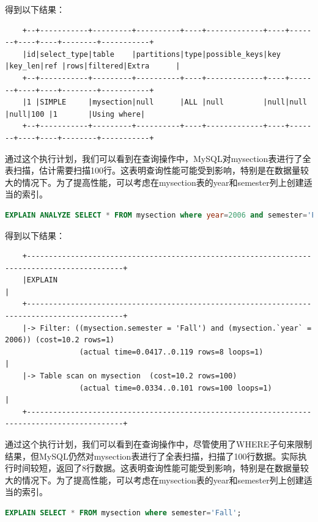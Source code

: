 \documentclass{article}
\begin{document}
	得到以下结果：
	
	\begin{verbatim}
	+--+-----------+---------+----------+----+-------------+----+-------+----+----+--------+-----------+
	|id|select_type|table    |partitions|type|possible_keys|key |key_len|ref |rows|filtered|Extra      |
	+--+-----------+---------+----------+----+-------------+----+-------+----+----+--------+-----------+
	|1 |SIMPLE     |mysection|null      |ALL |null         |null|null   |null|100 |1       |Using where|
	+--+-----------+---------+----------+----+-------------+----+-------+----+----+--------+-----------+
	\end{verbatim}
	
	通过这个执行计划，我们可以看到在查询操作中，MySQL对mysection表进行了全表扫描，估计需要扫描100行。这表明查询性能可能受到影响，特别是在数据量较大的情况下。为了提高性能，可以考虑在mysection表的year和semester列上创建适当的索引。
	
	\begin{lstlisting}[language=sql, title=索引对查询性能的影响, tabsize=4]
	EXPLAIN ANALYZE SELECT * FROM mysection where year=2006 and semester='Fall';
	\end{lstlisting}
	
	得到以下结果：
	
	\begin{verbatim}
	+--------------------------------------------------------------------------------------------+
	|EXPLAIN                                                                                     |
	+--------------------------------------------------------------------------------------------+
	|-> Filter: ((mysection.semester = 'Fall') and (mysection.`year` = 2006)) (cost=10.2 rows=1) 
	             (actual time=0.0417..0.119 rows=8 loops=1)                                      |
	|-> Table scan on mysection  (cost=10.2 rows=100) 
				 (actual time=0.0334..0.101 rows=100 loops=1)                                             |
	+--------------------------------------------------------------------------------------------+
	\end{verbatim}
	
	通过这个执行计划，我们可以看到在查询操作中，尽管使用了WHERE子句来限制结果，但MySQL仍然对mysection表进行了全表扫描，扫描了100行数据。实际执行时间较短，返回了8行数据。这表明查询性能可能受到影响，特别是在数据量较大的情况下。为了提高性能，可以考虑在mysection表的year和semester列上创建适当的索引。
	
	\begin{lstlisting}[language=sql, title=索引对查询性能的影响, tabsize=4]
	EXPLAIN SELECT * FROM mysection where semester='Fall';
	\end{lstlisting}
	
\end{document}
